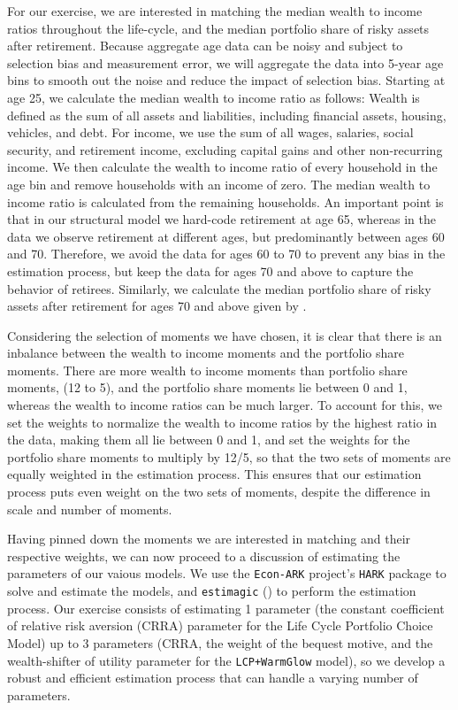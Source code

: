 \documentclass{article}
\begin{document}
For our exercise, we are interested in matching the median wealth to income ratios throughout the life-cycle, and the median portfolio share of risky assets after retirement. Because aggregate age data can be noisy and subject to selection bias and measurement error, we will aggregate the data into 5-year age bins to smooth out the noise and reduce the impact of selection bias. Starting at age 25, we calculate the median wealth to income ratio as follows: Wealth is defined as the sum of all assets and liabilities, including financial assets, housing, vehicles, and debt. For income, we use the sum of all wages, salaries, social security, and retirement income, excluding capital gains and other non-recurring income. We then calculate the wealth to income ratio of every household in the age bin and remove households with an income of zero. The median wealth to income ratio is calculated from the remaining households. An important point is that in our structural model we hard-code retirement at age 65, whereas in the data we observe retirement at different ages, but predominantly between ages 60 and 70. Therefore, we avoid the data for ages 60 to 70 to prevent any bias in the estimation process, but keep the data for ages 70 and above to capture the behavior of retirees. Similarly, we calculate the median portfolio share of risky assets after retirement for ages 70 and above given by \cite{Aboagye2024}.

Considering the selection of moments we have chosen, it is clear that there is an inbalance between the wealth to income moments and the portfolio share moments. There are more wealth to income moments than portfolio share moments, (12 to 5), and the portfolio share moments lie between 0 and 1, whereas the wealth to income ratios can be much larger. To account for this, we set the weights to normalize the wealth to income ratios by the highest ratio in the data, making them all lie between 0 and 1, and set the weights for the portfolio share moments to multiply by 12/5, so that the two sets of moments are equally weighted in the estimation process. This ensures that our estimation process puts even weight on the two sets of moments, despite the difference in scale and number of moments.

Having pinned down the moments we are interested in matching and their respective weights, we can now proceed to a discussion of estimating the parameters of our vaious models. We use the \texttt{Econ-ARK} project's \texttt{HARK} package to solve and estimate the models, and \texttt{estimagic} (\cite{Gabler2022}) to perform the estimation process. Our exercise consists of estimating 1 parameter (the constant coefficient of relative risk aversion (CRRA) parameter for the Life Cycle Portfolio Choice Model) up to 3 parameters (CRRA, the weight of the bequest motive, and the wealth-shifter of utility parameter for the \texttt{LCP+WarmGlow} model), so we develop a robust and efficient estimation process that can handle a varying number of parameters. 
\end{document}

